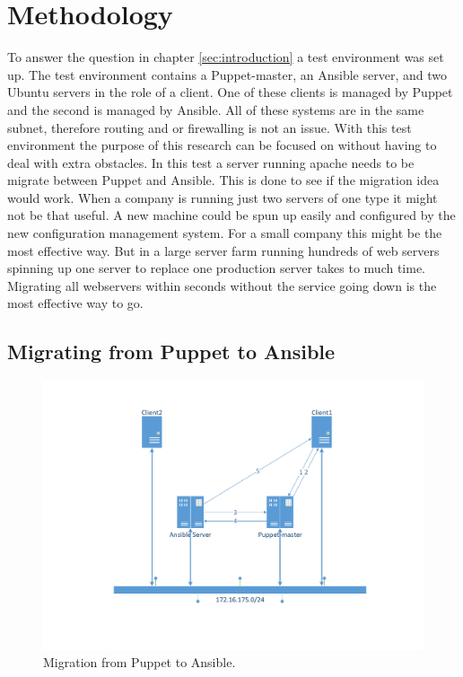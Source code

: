 \section{Methodology}\label{sec:methodology}

To answer the question in chapter \ref{sec:introduction} a test environment was set up. The test environment contains a Puppet-master, an Ansible server, and two Ubuntu servers in the role of a  client. One of these clients is managed by Puppet and the second is managed by Ansible. All of these systems are in the same subnet, therefore routing and or firewalling is not an issue. With this test environment the purpose of this research can be focused on without having to deal with extra obstacles.  
In this test a server running apache needs to be  migrate between Puppet and Ansible. This is done to see if the migration idea would work. When a company is running just two servers of one type it might not be that useful. A new machine could be spun up easily and configured by the new configuration management system. For a small company this might be the most effective way. But in a large server farm running hundreds of web servers spinning up one server to replace one production server takes to much time. Migrating all webservers within seconds without the service going down is the most effective way to go.  

\subsection{Migrating from Puppet to Ansible}\label{subsec:puppettoansible}

\begin{figure}[!hb]
    \begin{center}
        \includegraphics[scale=0.55]{img/PuppettoAnsible.pdf}
        \caption{Migration from Puppet to Ansible.}
        \label{fig:situation1}
    \end{center}
\end{figure}

